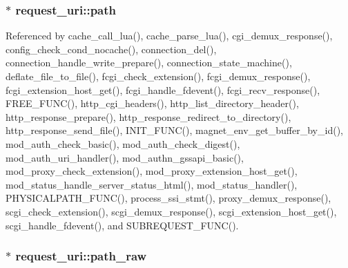 \hypertarget{structrequest__uri_a508eadf9e21989cd41cb45fe7c0475c4}{
\subsubsection[{path}]{$\ast$ request\-\_\-uri\-::path}}\label{structrequest__uri_a508eadf9e21989cd41cb45fe7c0475c4}


Referenced by cache\-\_\-call\-\_\-lua(), cache\-\_\-parse\-\_\-lua(), cgi\-\_\-demux\-\_\-response(), config\-\_\-check\-\_\-cond\-\_\-nocache(), connection\-\_\-del(), connection\-\_\-handle\-\_\-write\-\_\-prepare(), connection\-\_\-state\-\_\-machine(), deflate\-\_\-file\-\_\-to\-\_\-file(), fcgi\-\_\-check\-\_\-extension(), fcgi\-\_\-demux\-\_\-response(), fcgi\-\_\-extension\-\_\-host\-\_\-get(), fcgi\-\_\-handle\-\_\-fdevent(), fcgi\-\_\-recv\-\_\-response(), F\-R\-E\-E\-\_\-\-F\-U\-N\-C(), http\-\_\-cgi\-\_\-headers(), http\-\_\-list\-\_\-directory\-\_\-header(), http\-\_\-response\-\_\-prepare(), http\-\_\-response\-\_\-redirect\-\_\-to\-\_\-directory(), http\-\_\-response\-\_\-send\-\_\-file(), I\-N\-I\-T\-\_\-\-F\-U\-N\-C(), magnet\-\_\-env\-\_\-get\-\_\-buffer\-\_\-by\-\_\-id(), mod\-\_\-auth\-\_\-check\-\_\-basic(), mod\-\_\-auth\-\_\-check\-\_\-digest(), mod\-\_\-auth\-\_\-uri\-\_\-handler(), mod\-\_\-authn\-\_\-gssapi\-\_\-basic(), mod\-\_\-proxy\-\_\-check\-\_\-extension(), mod\-\_\-proxy\-\_\-extension\-\_\-host\-\_\-get(), mod\-\_\-status\-\_\-handle\-\_\-server\-\_\-status\-\_\-html(), mod\-\_\-status\-\_\-handler(), P\-H\-Y\-S\-I\-C\-A\-L\-P\-A\-T\-H\-\_\-\-F\-U\-N\-C(), process\-\_\-ssi\-\_\-stmt(), proxy\-\_\-demux\-\_\-response(), scgi\-\_\-check\-\_\-extension(), scgi\-\_\-demux\-\_\-response(), scgi\-\_\-extension\-\_\-host\-\_\-get(), scgi\-\_\-handle\-\_\-fdevent(), and S\-U\-B\-R\-E\-Q\-U\-E\-S\-T\-\_\-\-F\-U\-N\-C().

\hypertarget{structrequest__uri_a2dfa985efd813074da98d2d75c4ae8e3}{
\subsubsection[{path\-\_\-raw}]{$\ast$ request\-\_\-uri\-::path\-\_\-raw}}\label{structrequest__uri_a2dfa985efd813074da98d2d75c4ae8e3}


